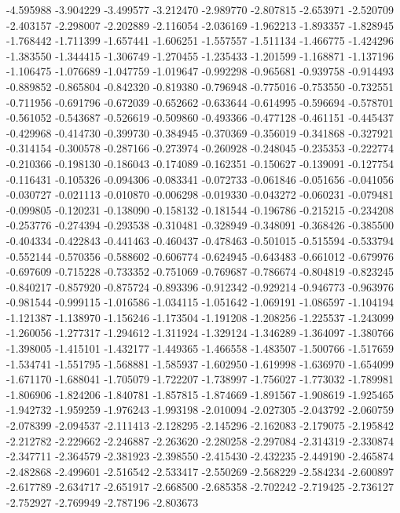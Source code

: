 -4.595988
-3.904229
-3.499577
-3.212470
-2.989770
-2.807815
-2.653971
-2.520709
-2.403157
-2.298007
-2.202889
-2.116054
-2.036169
-1.962213
-1.893357
-1.828945
-1.768442
-1.711399
-1.657441
-1.606251
-1.557557
-1.511134
-1.466775
-1.424296
-1.383550
-1.344415
-1.306749
-1.270455
-1.235433
-1.201599
-1.168871
-1.137196
-1.106475
-1.076689
-1.047759
-1.019647
-0.992298
-0.965681
-0.939758
-0.914493
-0.889852
-0.865804
-0.842320
-0.819380
-0.796948
-0.775016
-0.753550
-0.732551
-0.711956
-0.691796
-0.672039
-0.652662
-0.633644
-0.614995
-0.596694
-0.578701
-0.561052
-0.543687
-0.526619
-0.509860
-0.493366
-0.477128
-0.461151
-0.445437
-0.429968
-0.414730
-0.399730
-0.384945
-0.370369
-0.356019
-0.341868
-0.327921
-0.314154
-0.300578
-0.287166
-0.273974
-0.260928
-0.248045
-0.235353
-0.222774
-0.210366
-0.198130
-0.186043
-0.174089
-0.162351
-0.150627
-0.139091
-0.127754
-0.116431
-0.105326
-0.094306
-0.083341
-0.072733
-0.061846
-0.051656
-0.041056
-0.030727
-0.021113
-0.010870
-0.006298
-0.019330
-0.043272
-0.060231
-0.079481
-0.099805
-0.120231
-0.138090
-0.158132
-0.181544
-0.196786
-0.215215
-0.234208
-0.253776
-0.274394
-0.293538
-0.310481
-0.328949
-0.348091
-0.368426
-0.385500
-0.404334
-0.422843
-0.441463
-0.460437
-0.478463
-0.501015
-0.515594
-0.533794
-0.552144
-0.570356
-0.588602
-0.606774
-0.624945
-0.643483
-0.661012
-0.679976
-0.697609
-0.715228
-0.733352
-0.751069
-0.769687
-0.786674
-0.804819
-0.823245
-0.840217
-0.857920
-0.875724
-0.893396
-0.912342
-0.929214
-0.946773
-0.963976
-0.981544
-0.999115
-1.016586
-1.034115
-1.051642
-1.069191
-1.086597
-1.104194
-1.121387
-1.138970
-1.156246
-1.173504
-1.191208
-1.208256
-1.225537
-1.243099
-1.260056
-1.277317
-1.294612
-1.311924
-1.329124
-1.346289
-1.364097
-1.380766
-1.398005
-1.415101
-1.432177
-1.449365
-1.466558
-1.483507
-1.500766
-1.517659
-1.534741
-1.551795
-1.568881
-1.585937
-1.602950
-1.619998
-1.636970
-1.654099
-1.671170
-1.688041
-1.705079
-1.722207
-1.738997
-1.756027
-1.773032
-1.789981
-1.806906
-1.824206
-1.840781
-1.857815
-1.874669
-1.891567
-1.908619
-1.925465
-1.942732
-1.959259
-1.976243
-1.993198
-2.010094
-2.027305
-2.043792
-2.060759
-2.078399
-2.094537
-2.111413
-2.128295
-2.145296
-2.162083
-2.179075
-2.195842
-2.212782
-2.229662
-2.246887
-2.263620
-2.280258
-2.297084
-2.314319
-2.330874
-2.347711
-2.364579
-2.381923
-2.398550
-2.415430
-2.432235
-2.449190
-2.465874
-2.482868
-2.499601
-2.516542
-2.533417
-2.550269
-2.568229
-2.584234
-2.600897
-2.617789
-2.634717
-2.651917
-2.668500
-2.685358
-2.702242
-2.719425
-2.736127
-2.752927
-2.769949
-2.787196
-2.803673
